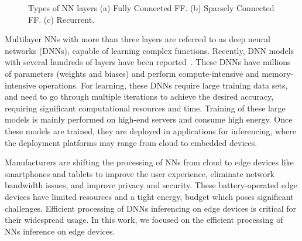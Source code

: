 \documentclass[a4paper,10pt]{article}
\begin{document}
\begin{figure}[!htb]
	\centering
    \captionsetup{font=sf}
	\hfil
	\hfil
	\caption{Types of NN layers (a) Fully Connected FF. (b) Sparsely Connected FF. (c) Recurrent. }
	\label{fig:nnLayers}
\end{figure}

Multilayer NNs with more than three layers are referred to as deep neural networks (DNNs), capable of learning complex functions. Recently, DNN models with several hundreds of layers have been reported~\cite{he2016deep}. These DNNs have millions of parameters (weights and biases) and perform compute-intensive and memory-intensive operations. For learning, these DNNs require large training data sets, and need to go through multiple iterations to achieve the desired accuracy, requiring significant computational resources and time. Training of these large models is mainly performed on high-end servers and consume high energy. Once these models are trained, they are deployed in applications for inferencing, where the deployment platforms may range from cloud to embedded devices.

Manufacturers are shifting the processing of NNs from cloud to edge devices like smartphones and tablets to improve the user experience, eliminate network bandwidth issues, and improve privacy and security. These battery-operated edge devices have limited resources and a tight energy, budget which poses significant challenges. Efficient processing of DNNs inferencing on edge devices is critical for their widespread usage. In this work, we focused on the efficient processing of NNs inference on edge devices. 
\end{document}
